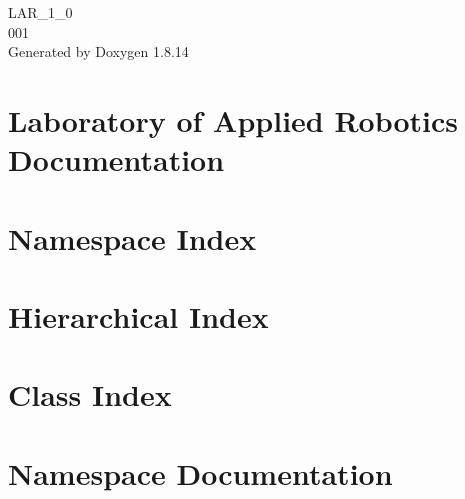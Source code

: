 \documentclass[twoside]{book}
\newcommand{\+}{\discretionary{\mbox{\scriptsize$\hookleftarrow$}}{}{}}
\newcommand{\clearemptydoublepage}{%
  \newpage{\pagestyle{empty}\cleardoublepage}%
}
\begin{document}
\hypersetup{pageanchor=false,
             bookmarksnumbered=true,
             pdfencoding=unicode
            }
\begin{titlepage}
\vspace*{7cm}
\begin{center}%
{\Large L\+A\+R\+\_\+1\+\_\+0 \\[1ex]\large 001 }\\
\vspace*{1cm}
{\large Generated by Doxygen 1.8.14}\\
\end{center}
\end{titlepage}
\clearemptydoublepage
{}
\tableofcontents
\clearemptydoublepage
{}
\hypersetup{pageanchor=true}

\chapter{Laboratory of Applied Robotics Documentation}
\label{index}\hypertarget{index}{}
\chapter{Namespace Index}

\chapter{Hierarchical Index}

\chapter{Class Index}

\chapter{Namespace Documentation}




\end{document}
